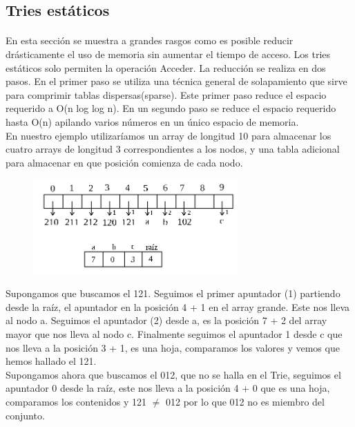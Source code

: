 \documentclass[es]{ifirak}
\begin{document}
\subsection{Tries estáticos}
\large{
\paragraph{}En esta sección se muestra a grandes rasgos como es posible reducir drásticamente el uso de memoria sin aumentar el tiempo de acceso. Los tries estáticos solo permiten la operación Acceder. La reducción se realiza en dos pasos. En el primer paso se utiliza una técnica general de solapamiento que sirve para comprimir tablas dispersas(sparse). Este primer paso reduce el espacio requerido a O(n log log n). En un segundo paso se reduce el espacio requerido hasta O(n) apilando varios números en un único espacio de memoria.\\

En nuestro ejemplo utilizaríamos un array de longitud 10 para almacenar los cuatro arrays de longitud 3 correspondientes a los nodos, y una tabla adicional para almacenar en que posición comienza de cada nodo.\\

\begin{figure}[hbtp]
	\centering
	\includegraphics[width=0.7\textwidth]{trie4.png}
\end{figure}

Supongamos que buscamos el 121. Seguimos el primer apuntador (1) partiendo desde la raíz, el apuntador en la posición 4 + 1 en el array grande. Este nos lleva al nodo a. Seguimos el apuntador (2) desde a, es la posición 7 + 2 del array mayor que nos lleva al nodo c. Finalmente seguimos el apuntador 1 desde c que nos lleva a la posición 3 + 1, es una hoja, comparamos los valores y vemos que hemos hallado el 121.\\

Supongamos ahora que buscamos el 012, que no se halla en el Trie, seguimos el apuntador 0 desde la raíz, este nos lleva a la posición 4 + 0 que es una hoja, comparamos los contenidos y 121 $\neq$ 012 por lo que 012 no es miembro del conjunto.\\

}
\end{document}
